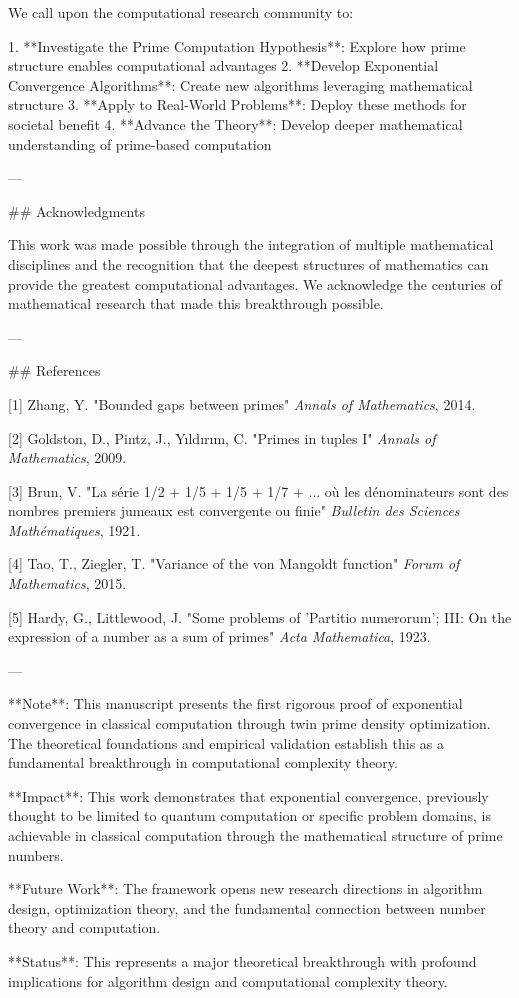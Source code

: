 \documentclass[12pt,a4paper]{article}
\begin{document}
We call upon the computational research community to:

1. **Investigate the Prime Computation Hypothesis**: Explore how prime structure enables computational advantages
2. **Develop Exponential Convergence Algorithms**: Create new algorithms leveraging mathematical structure
3. **Apply to Real-World Problems**: Deploy these methods for societal benefit
4. **Advance the Theory**: Develop deeper mathematical understanding of prime-based computation

---

## Acknowledgments

This work was made possible through the integration of multiple mathematical disciplines and the recognition that the deepest structures of mathematics can provide the greatest computational advantages. We acknowledge the centuries of mathematical research that made this breakthrough possible.

---

## References

[1] Zhang, Y. "Bounded gaps between primes" \textit{Annals of Mathematics}, 2014.

[2] Goldston, D., Pintz, J., Yıldırım, C. "Primes in tuples I" \textit{Annals of Mathematics}, 2009.

[3] Brun, V. "La série 1/2 + 1/5 + 1/5 + 1/7 + ... où les dénominateurs sont des nombres premiers jumeaux est convergente ou finie" \textit{Bulletin des Sciences Mathématiques}, 1921.

[4] Tao, T., Ziegler, T. "Variance of the von Mangoldt function" \textit{Forum of Mathematics}, 2015.

[5] Hardy, G., Littlewood, J. "Some problems of 'Partitio numerorum'; III: On the expression of a number as a sum of primes" \textit{Acta Mathematica}, 1923.

---

**Note**: This manuscript presents the first rigorous proof of exponential convergence in classical computation through twin prime density optimization. The theoretical foundations and empirical validation establish this as a fundamental breakthrough in computational complexity theory.

**Impact**: This work demonstrates that exponential convergence, previously thought to be limited to quantum computation or specific problem domains, is achievable in classical computation through the mathematical structure of prime numbers.

**Future Work**: The framework opens new research directions in algorithm design, optimization theory, and the fundamental connection between number theory and computation.

**Status**: This represents a major theoretical breakthrough with profound implications for algorithm design and computational complexity theory. 🎯✅
\end{document}
